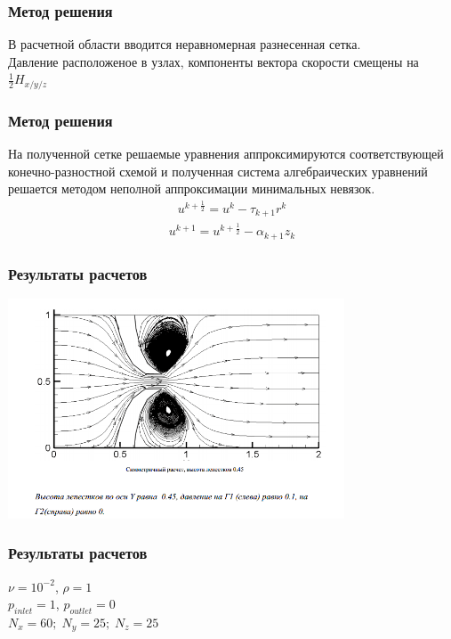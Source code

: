 \documentclass[14pt]{beamer}
\begin{document}
\begin{frame}
\frametitle{Метод решения}
В расчетной области вводится неравномерная разнесенная сетка.\\ Давление расположеное в узлах, компоненты вектора скорости смещены на $\frac{1}{2}H_{x/y/z}$
\end{frame}

\begin{frame}
\frametitle{Метод решения}
На полученной сетке решаемые уравнения аппроксимируются соответствующей конечно-разностной схемой и полученная система алгебраических уравнений решается методом неполной аппроксимации минимальных невязок.
\begin{eqnarray}
\label{eq:Alg_first}
u^{k+\frac{1}{2}}=u^k-\tau_{k+1}r^k
\end{eqnarray}
\begin{eqnarray}
\label{eq:Alg_second}
u^{k+1}=u^{k+\frac{1}{2}}-\alpha_{k+1}z_k
\end{eqnarray}
\end{frame}

\begin{frame}
\frametitle{Результаты расчетов}
    \begin{center}
	\includegraphics[width=10cm]{valves1-2d.png}
    \end{center}
\end{frame}

\begin{frame}
\frametitle{Результаты расчетов}
\begin{center}
    $\nu = 10^{-2}$, $\rho = 1$\\
    $p_{inlet} = 1$, $p_{outlet} = 0$\\
    $N_{x}=60;\;N_{y}=25;\;N_{z}=25$
\end{center}
\end{frame}
\end{document}
